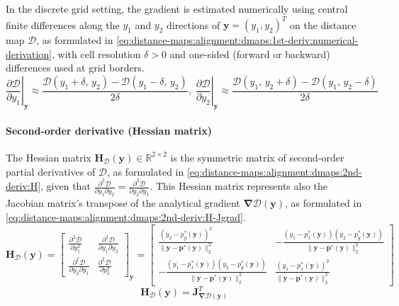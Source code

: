 In the discrete grid setting, the gradient is estimated numerically using
central finite differences along the $y_1$ and $y_2$ directions of
$\mathbf{y} = (y_1, y_2)^T$ on the distance map $\mathcal{D}$, as
formulated in
\eqref{eq:distance-maps:alignment:dmaps:1st-deriv:numerical-derivation},
with cell resolution $\delta > 0$ and one-sided (forward or backward)
differences used at grid borders.
\begin{equation}
\label{eq:distance-maps:alignment:dmaps:1st-deriv:numerical-derivation}
\left.\frac{\partial \mathcal{D}}{\partial y_1}\right|_{\mathbf{y}}
\approx
\frac{\mathcal{D}(y_1 + \delta,\, y_2) -
      \mathcal{D}(y_1 - \delta,\, y_2)}{2\delta},
\;
\left.\frac{\partial \mathcal{D}}{\partial y_2}\right|_{\mathbf{y}}
\approx
\frac{\mathcal{D}(y_1,\, y_2 + \delta) -
      \mathcal{D}(y_1,\, y_2 - \delta)}{2\delta}
\end{equation}

\paragraph{Second-order derivative (Hessian matrix)}

The Hessian matrix $\mathbf{H}_{\mathcal{D}}(\mathbf{y})\in\mathbb{R}^{2\times2}$
is the symmetric matrix of second-order partial derivatives of $\mathcal{D}$, as
formulated in \eqref{eq:distance-maps:alignment:dmaps:2nd-deriv:H}, given that
$\frac{\partial^2 \mathcal{D}}{\partial y_1 \partial y_2} = \frac{\partial^2 \mathcal{D}}{\partial y_2 \partial y_1}$.
This Hessian matrix represents also the Jacobian matrix's transpose of
the analytical gradient $\bm{\nabla}\mathcal{D}(\mathbf{y})$, as formulated in
\eqref{eq:distance-maps:alignment:dmaps:2nd-deriv:H-Jgrad}.
\begin{equation}
\label{eq:distance-maps:alignment:dmaps:2nd-deriv:H}
\mathbf{H}_{\mathcal{D}}(\mathbf{y}) =
\begin{bmatrix}
\frac{\partial^2 \mathcal{D}}{\partial y_1^2} &
\frac{\partial^2 \mathcal{D}}{\partial y_1 \partial y_2} \\
\frac{\partial^2 \mathcal{D}}{\partial y_2 \partial y_1} &
\frac{\partial^2 \mathcal{D}}{\partial y_2^2}
\end{bmatrix}_{\mathbf{y}} =
\begin{bmatrix}
\frac{(y_2 - p_y^*(\mathbf{y}))^2}{\|\mathbf{y} - \mathbf{p}^*(\mathbf{y})\|_2^3} &
-\frac{(y_1 - p_x^*(\mathbf{y}))(y_2 - p_y^*(\mathbf{y}))}{\|\mathbf{y} - \mathbf{p}^*(\mathbf{y})\|_2^3}\\
-\frac{(y_1 - p_x^*(\mathbf{y}))(y_2 - p_y^*(\mathbf{y}))}{\|\mathbf{y} - \mathbf{p}^*(\mathbf{y})\|_2^3} &
\frac{(y_1 - p_x^*(\mathbf{y}))^2}{\|\mathbf{y} - \mathbf{p}^*(\mathbf{y})\|_2^3}
\end{bmatrix}
\end{equation}
\begin{equation}
\label{eq:distance-maps:alignment:dmaps:2nd-deriv:H-Jgrad}
\mathbf{H}_{\mathcal{D}}(\mathbf{y}) =
\mathbf{J}_{\bm{\nabla}\mathcal{D}(\mathbf{y})}^T
\end{equation}

